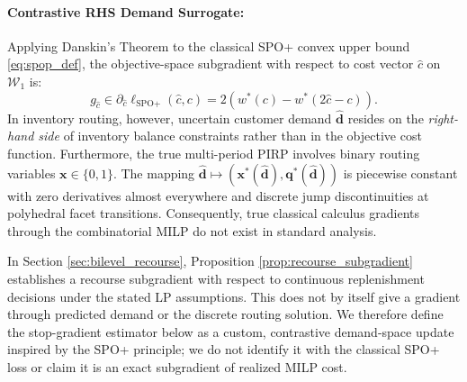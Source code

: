 \documentclass[11pt,a4paper]{article}
\theoremstyle{definition}
\theoremstyle{remark}
\begin{document}
\paragraph{Contrastive RHS Demand Surrogate:}
Applying Danskin's Theorem to the classical SPO+ convex upper bound \eqref{eq:spop_def}, the objective-space subgradient with respect to cost vector $\hat{c}$ on $\mathcal{W}_1$ is:
\begin{equation}
    g_{\hat{c}} \in \partial_{\hat{c}} \ell_{\text{SPO}+}(\hat{c}, c) = 2 \left( w^*(c) - w^*(2\hat{c} - c) \right). \label{eq:spop_subgradient}
\end{equation}
In inventory routing, however, uncertain customer demand $\hat{\mathbf{d}}$ resides on the \textit{right-hand side} of inventory balance constraints rather than in the objective cost function. Furthermore, the true multi-period PIRP involves binary routing variables $\mathbf{x} \in \{0, 1\}$. The mapping $\hat{\mathbf{d}} \mapsto (\mathbf{x}^*(\hat{\mathbf{d}}), \mathbf{q}^*(\hat{\mathbf{d}}))$ is piecewise constant with zero derivatives almost everywhere and discrete jump discontinuities at polyhedral facet transitions. Consequently, true classical calculus gradients through the combinatorial MILP do not exist in standard analysis.

In Section \ref{sec:bilevel_recourse}, Proposition \ref{prop:recourse_subgradient} establishes a recourse subgradient with respect to continuous replenishment decisions under the stated LP assumptions. This does not by itself give a gradient through predicted demand or the discrete routing solution. We therefore define the stop-gradient estimator below as a custom, contrastive demand-space update inspired by the SPO+ principle; we do not identify it with the classical SPO+ loss or claim it is an exact subgradient of realized MILP cost.
\end{document}
